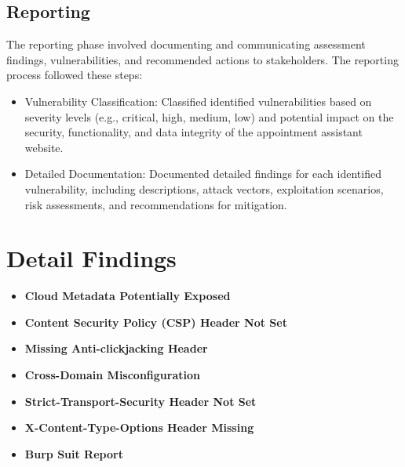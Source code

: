 \documentclass[openany]{report}
\begin{document}
\section{Reporting}
The reporting phase involved documenting and communicating assessment findings, vulnerabilities, and recommended actions to stakeholders. The reporting process followed these steps:
\begin{itemize}
    \item Vulnerability Classification: Classified identified vulnerabilities based on severity levels (e.g., critical, high, medium, low) and potential impact on the security, functionality, and data integrity of the appointment assistant website.
    \item Detailed Documentation: Documented detailed findings for each identified vulnerability, including descriptions, attack vectors, exploitation scenarios, risk assessments, and recommendations for mitigation.
\end{itemize}
\chapter{Detail Findings}
\begin{itemize}
    \item \textbf{ Cloud Metadata Potentially Exposed}
    \item \textbf{ Content Security Policy (CSP) Header Not Set}
    \item \textbf{ Missing Anti-clickjacking Header}
    \item \textbf{ Cross-Domain Misconfiguration}
    \item \textbf{ Strict-Transport-Security Header Not Set}
    \item \textbf{ X-Content-Type-Options Header Missing}
    \item \textbf{ Burp Suit Report}
\end{itemize}
\end{document}
